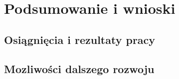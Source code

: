 \chapter{Podsumowanie i wnioski}

\section{Osiągnięcia i rezultaty pracy}

\section{Mozliwości dalszego rozwoju}